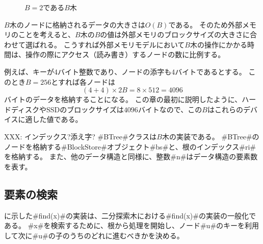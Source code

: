 \begin{figure}
  \caption{$B=2$である$B$木}
\end{figure}

$B$木のノードに格納されるデータの大きさは$O(B)$である。
そのため外部メモリのことを考えると、$B$木の$B$の値は外部メモリのブロックサイズの大きさに合わせて選ばれる。
こうすれば外部メモリモデルにおいて$B$木の操作にかかる時間は、操作の際にアクセス（読み書き）するノードの数に比例する。

例えば、キーが4バイト整数であり、ノードの添字も4バイトであるとする。
このとき$B=256$とすれば各ノードは
\[
(4+4)\times 2B
 = 8\times512=4096
\]
バイトのデータを格納することになる。
この章の最初に説明したように、ハードディスクやSSDのブロックサイズは$4096$バイトなので、この$B$はこれらのデバイスに適した値である。

XXX: インデックス?添え字?
#BTree#クラスは$B$木の実装である。
#BTree#のノードを格納する#BlockStore#オブジェクト#bs#と、根のインデックス#ri#を格納する。
また、他のデータ構造と同様に、整数#n#はデータ構造の要素数を表す。

\subsection{要素の検索}

に示した#find(x)#の実装は、二分探索木における#find(x)#の実装の一般化である。
#x#を検索するために、根から処理を開始し、ノード#u#のキーを利用して次に#u#の子のうちのどれに進むべきかを決める。

